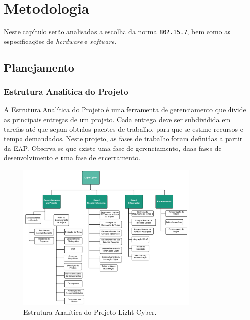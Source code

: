 	\chapter{Metodologia}\label{cap-metodologia}

	Neste capítulo serão analisadas a escolha da norma \texttt{802.15.7}, bem como as especificações de \textit{hardware} e \textit{software}.

	\section{Planejamento}\label{sec-planejamento}

	\subsection{Estrutura Analítica do Projeto}\label{subsec-eap}

	A Estrutura Analítica do Projeto é uma ferramenta de gerenciamento que divide as principais entregas de um projeto. Cada entrega deve ser subdividida em tarefas até que sejam obtidos pacotes de trabalho, para que se estime recursos e tempo demandados. Neste projeto, as fases de trabalho foram definidas a partir da EAP. Observa-se que existe uma fase de gerenciamento, duas fases de desenvolvimento e uma fase de encerramento.

	\begin{figure}[h!]
		\caption{\label{fig_eap}Estrutura Analítica do Projeto Light Cyber.}
		\centering
		\includegraphics[width=0.8\textwidth, trim={0cm 0cm 0cm 0cm}, clip]{EAP.pdf}
	\end{figure}

